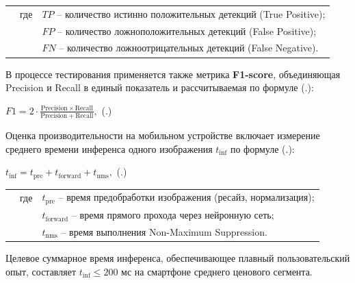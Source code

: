 {  \begin{tabular}{p{0.875cm}p{0.3cm}p{15.175cm}}
      & где  & $TP$ {--} количество истинно положительных детекций (True Positive); \\
      &      & $FP$ {--} количество ложноположительных детекций (False Positive); \\
      &      & $FN$ {--} количество ложноотрицательных детекций (False Negative). \\
  \end{tabular}
  \vspace{13pt}

  \par \redline В процессе тестирования применяется также метрика \textbf{F1-score}, объединяющая Precision и Recall в единый показатель и рассчитываемая по формуле (\thechaptercntr .\theformulacntr):

  \formulaspace 
  \par \redline $F1 = 2 \cdot \frac{\mathrm{Precision} \times \mathrm{Recall}}{\mathrm{Precision} + \mathrm{Recall}},$
  \hfill (\thechaptercntr .\theformulacntr) \hspace*{-0.5cm}\redline
  \formulaspace \addtocounter{formulacntr}{1}

  \par \redline Оценка производительности на мобильном устройстве включает измерение среднего времени инференса одного изображения $t_{\mathrm{inf}}$ по формуле (\thechaptercntr .\theformulacntr):

  \formulaspace 
  \par \redline $t_{\mathrm{inf}} = t_{\mathrm{pre}} + t_{\mathrm{forward}} + t_{\mathrm{nms}},$
  \hfill (\thechaptercntr .\theformulacntr) \hspace*{-0.5cm}\redline
  \formulaspace \addtocounter{formulacntr}{1}

  \begin{tabular}{p{0.875cm}p{0.3cm}p{15.175cm}}
      & где  & $t_{\mathrm{pre}}$ {--} время предобработки изображения (ресайз, нормализация); \\
      &      & $t_{\mathrm{forward}}$ {--} время прямого прохода через нейронную сеть; \\
      &      & $t_{\mathrm{nms}}$ {--} время выполнения Non-Maximum Suppression. \\
  \end{tabular}
  \vspace{13pt}

  \par \redline Целевое суммарное время инференса, обеспечивающее плавный пользовательский опыт, составляет $t_{\mathrm{inf}} \leq 200$ мс на смартфоне среднего ценового сегмента.

}
